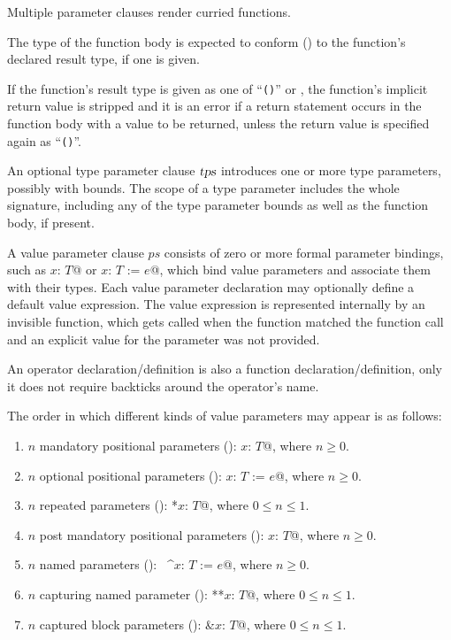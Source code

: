 Multiple parameter clauses render curried functions. 

The type of the function body is expected to conform () to the function's declared result type, if one is given. 

If the function's result type is given as one of ``\lstinline!()!'' or , the function's implicit return value is stripped and it is an error if a return statement occurs in the function body with a value to be returned, unless the return value is specified again as ``\lstinline!()!''.

An optional type parameter clause $\mbox{\sl tps}$ introduces one or more type parameters, possibly with bounds. The scope of a type parameter includes the whole signature, including any of the type parameter bounds as well as the function body, if present. 

A value parameter clause $ps$ consists of zero or more formal parameter bindings, such as \lstinline@$x$: $T$@ or \lstinline@$x$: $T$ := $e$@, which bind value parameters and associate them with their types. Each value parameter declaration may optionally define a default value expression. The value expression is represented internally by an invisible function, which gets called when the function matched the function call and an explicit value for the parameter was not provided.

An operator declaration/definition is also a function declaration/definition, only it does not require backticks around the operator's name. 

The order in which different kinds of value parameters may appear is as follows:
\begin{enumerate}
\item $n$ mandatory positional parameters (): \lstinline@$x$: $T$@, where $n \ge 0$.

\item $n$ optional positional parameters (): \lstinline@$x$: $T$ := $e$@, where $n \ge 0$. 

\item $n$ repeated parameters (): \lstinline@*$x$: $T$@, where $0 \le n \le 1$. 

\item $n$ post mandatory positional parameters (): \lstinline@$x$: $T$@, where $n \ge 0$.

\item $n$ named parameters (): ~\lstinline@^$x$: $T$ := $e$@, where $n \ge 0$. 

\item $n$ capturing named parameter (): \lstinline@**$x$: $T$@, where $0 \le n \le 1$. 

\item $n$ captured block parameters (): \lstinline@&$x$: $T$@, where $0 \le n \le 1$.
\end{enumerate}

